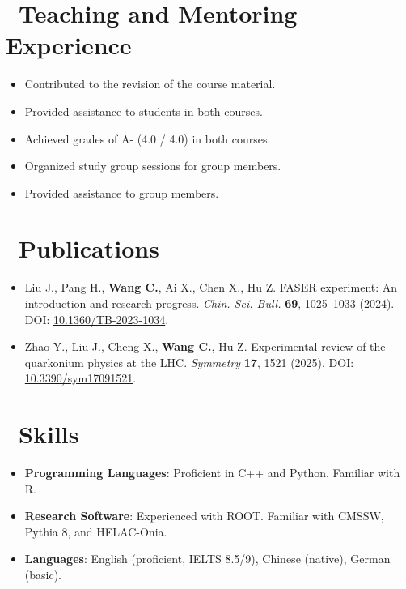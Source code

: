 \documentclass{resume}
\begin{document}

\section{\faUsers\ Teaching and Mentoring Experience}

\begin {itemize}
  \item Contributed to the revision of the course material.
  \item Provided assistance to students in both courses.
  \item Achieved grades of A- (4.0 / 4.0) in both courses.
\end{itemize}

\begin {itemize}
  \item Organized study group sessions for group members.
  \item Provided assistance to group members.
\end{itemize}


\section{\faFileText\ Publications}
\begin{itemize}
  \item Liu J., Pang H., \textbf{Wang C.}, Ai X., Chen X., Hu Z. FASER experiment: An introduction and research progress. \textit{Chin. Sci. Bull.} \textbf{69}, 1025–1033 (2024). DOI: \href{https://doi.org/10.1360/TB-2023-1034}{10.1360/TB-2023-1034}.
  \item Zhao Y., Liu J., Cheng X., \textbf{Wang C.}, Hu Z. Experimental review of the quarkonium physics at the LHC. \textit{Symmetry} \textbf{17}, 1521 (2025). DOI: \href{https://doi.org/10.3390/sym17091521}{10.3390/sym17091521}.
\end{itemize}


\section{\faCogs\ Skills}
\begin{itemize}[parsep=0.5ex]
  \item \textbf{Programming Languages}: Proficient in C++ and Python. Familiar with R.
  \item \textbf{Research Software}: Experienced with ROOT. Familiar with CMSSW, Pythia 8, and HELAC-Onia.
  \item \textbf{Languages}: English (proficient, IELTS 8.5/9), Chinese (native), German (basic).
\end{itemize}


%
%
\end{document}
